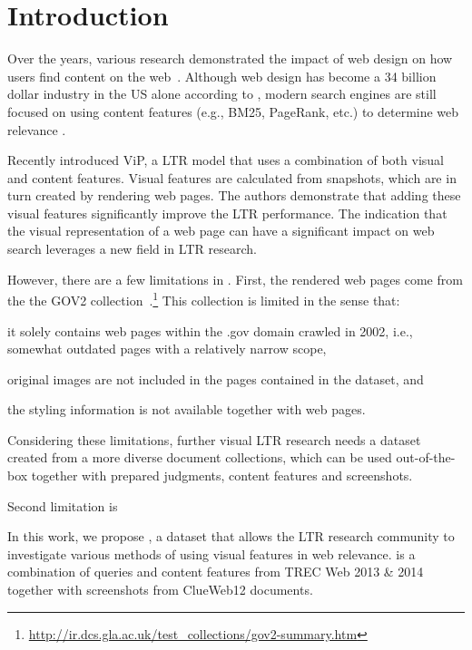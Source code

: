 
\section{Introduction}
Over the years, various research demonstrated the impact of web design on how users find content on the web~\cite{nielsen1999designing,nielsen2006f,pernice2017f,wang2014eye}.
Although web design has become a 34 billion dollar industry in the US alone according to \citet{ibisdesign}, modern search engines are still focused on using content features (e.g., BM25, PageRank, etc.) to determine web relevance . 

Recently \citet{fan2017learning} introduced ViP, a \ac{LTR} model that uses a combination of both visual and content features.
Visual features are calculated from snapshots, which are in turn created by rendering web pages.
The authors demonstrate that adding these visual features significantly improve the \ac{LTR} performance.
The indication that the visual representation of a web page can have a significant impact on web search leverages a new field in \ac{LTR} research.

However, there are a few limitations in \cite{fan2017learning}.
First, the rendered web pages come from the the GOV2 collection~.\footnote{\url{http://ir.dcs.gla.ac.uk/test_collections/gov2-summary.htm}}
This collection is limited in the sense that:
\begin{inparaenum}[(i)]
\item it solely contains web pages within the .gov domain crawled in 2002, i.e., somewhat outdated pages with a relatively narrow scope,
\item original images are not included in the pages contained in the dataset, and
\item the styling information is not available together with web pages.
\end{inparaenum}
Considering these limitations, further visual \ac{LTR} research needs a dataset created from a more diverse document collections, which can be used out-of-the-box together with prepared judgments, content features and screenshots. 

Second limitation is 

In this work, we propose \datasetname, a dataset that allows the \ac{LTR} research community to investigate various methods of using visual features in web relevance. \datasetname is a combination of queries and content features from TREC Web 2013 \& 2014 together with screenshots from ClueWeb12 documents. 

